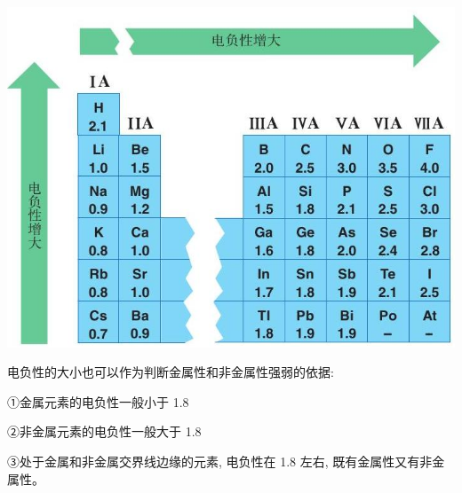 \documentclass[10pt,cn]{elegantbook}
\begin{document}
\begin{center}
	\includegraphics[max width=1.0\textwidth]{image/c68.jpg}
\end{center}

电负性的大小也可以作为判断金属性和非金属性强弱的依据:

①金属元素的电负性一般小于 1.8

②非金属元素的电负性一般大于 1.8

③处于金属和非金属交界线边缘的元素, 电负性在 1.8 左右, 既有金属性又有非金属性。
\end{document}
